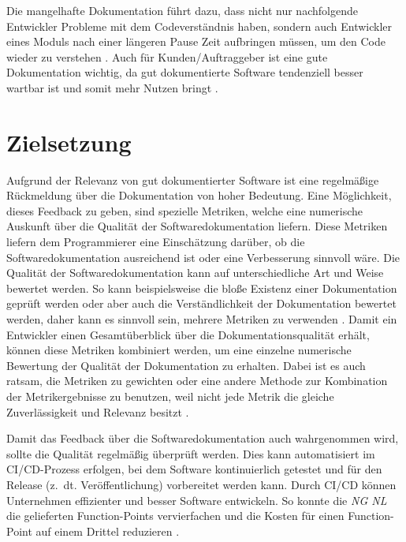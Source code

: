 Die mangelhafte Dokumentation führt dazu, dass nicht nur nachfolgende Entwickler Probleme mit dem Codeverständnis haben, sondern auch Entwickler eines Moduls nach einer längeren Pause Zeit aufbringen müssen, um den Code wieder zu verstehen \cite[S.~511]{vestdam}.  Auch für Kunden/Auftraggeber ist eine gute Dokumentation wichtig, da gut dokumentierte Software tendenziell besser wartbar ist und somit mehr Nutzen bringt \cite[S.~83]{Qualityanalysisofsourcecodecomments} \cite[S.~1]{SoftwareDocumentationManagementIssuesandPractices:ASurvey}.



\section{Zielsetzung}
Aufgrund der Relevanz von gut dokumentierter Software ist eine regelmäßige Rückmeldung über die Dokumentation von hoher Bedeutung. Eine Möglichkeit, dieses Feedback zu geben, sind spezielle Metriken, welche eine numerische Auskunft über die Qualität der Softwaredokumentation liefern. Diese Metriken liefern dem Programmierer eine Einschätzung darüber, ob die Softwaredokumentation ausreichend ist oder eine Verbesserung sinnvoll wäre. Die Qualität der Softwaredokumentation kann auf unterschiedliche Art und Weise bewertet werden. So kann beispielsweise die bloße Existenz einer Dokumentation geprüft werden oder aber auch die Verständlichkeit der Dokumentation bewertet werden, daher kann es sinnvoll sein, mehrere Metriken zu verwenden \cite[S.~29]{Pfleeger2005UsingMM}. Damit ein Entwickler einen Gesamtüberblick über die Dokumentationsqualität erhält, können diese Metriken kombiniert werden, um eine einzelne numerische Bewertung der Qualität der Dokumentation zu erhalten. 
Dabei ist es auch ratsam, die Metriken zu gewichten oder eine andere Methode zur Kombination der Metrikergebnisse zu benutzen, weil nicht jede Metrik die gleiche Zuverlässigkeit und Relevanz besitzt \cite[S.~1117ff.]{Softwarequalitymetricsaggregationinindustry}.

Damit das Feedback über die Softwaredokumentation auch wahrgenommen wird, sollte die Qualität regelmäßig  überprüft werden. Dies kann automatisiert im \ac{CI/CD}-Prozess erfolgen, bei dem Software kontinuierlich getestet und für den Release (z.~dt. Veröffentlichung) vorbereitet werden kann. Durch CI/CD können Unternehmen effizienter und besser Software entwickeln. So konnte die \textit{NG NL} die gelieferten Function-Points vervierfachen und die Kosten für einen Function-Point auf einem Drittel reduzieren \cite[S.~520]{Vassallo2016}.

